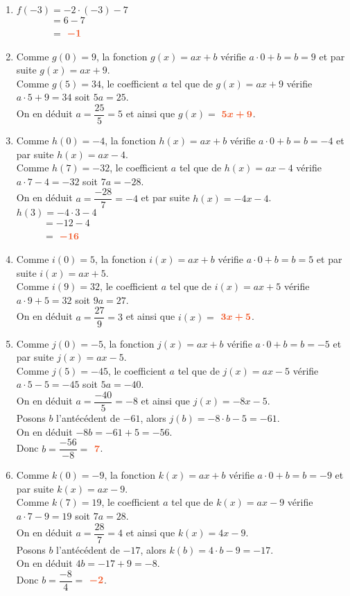 \documentclass[a4paper,12pt]{report}
\begin{document}
\begin{Correction}
\begin{EXO}{}{}

\begin{enumerate}[itemsep=3em]
\item $f(-3)=-2 \cdot (-3)-7$\\$\phantom{f(-3)}=6-7$\\$\phantom{f(-3)}=$ ${\color[HTML]{f15929}\boldsymbol{-1}}$
\item Comme $g(0)=9$, la fonction $g(x)=ax+b$ vérifie $a\cdot 0 + b = b = 9$ et par suite $g(x)=ax+9$.\\Comme $g(5)=34$, le coefficient $a$ tel que de $g(x)=ax+9$ vérifie $a\cdot 5+9 = 34$ soit $5a=25$.\\On en déduit $a=\dfrac{25}{5}=5$ et ainsi que $g(x)=$ ${\color[HTML]{f15929}\boldsymbol{5x+9}}$.
\item Comme $h(0)=-4$, la fonction $h(x)=ax+b$ vérifie $a\cdot 0 + b = b = -4$ et par suite $h(x)=ax-4$.\\Comme $h(7)=-32$, le coefficient $a$ tel que de $h(x)=ax-4$ vérifie $a\cdot 7-4 = -32$ soit $7a=-28$.\\On en déduit $a=\dfrac{-28}{7}=-4$ et par suite $h(x)=-4x-4$.\\$h(3)=-4 \cdot 3-4$\\$\phantom{f(3)}=-12-4$\\$\phantom{f(3)}=$ ${\color[HTML]{f15929}\boldsymbol{-16}}$
\item Comme $i(0)=5$, la fonction $i(x)=ax+b$ vérifie $a\cdot 0 + b = b = 5$ et par suite $i(x)=ax+5$.\\Comme $i(9)=32$, le coefficient $a$ tel que de $i(x)=ax+5$ vérifie $a\cdot 9+5 = 32$ soit $9a=27$.\\On en déduit $a=\dfrac{27}{9}=3$ et ainsi que $i(x)=$ ${\color[HTML]{f15929}\boldsymbol{3x+5}}$.
\item Comme $j(0)=-5$, la fonction $j(x)=ax+b$ vérifie $a\cdot 0 + b = b = -5$ et par suite $j(x)=ax-5$.\\Comme $j(5)=-45$, le coefficient $a$ tel que de $j(x)=ax-5$ vérifie $a\cdot 5-5 = -45$ soit $5a=-40$.\\On en déduit $a=\dfrac{-40}{5}=-8$ et ainsi que $j(x)=-8x-5$.\\Posons $b$ l'antécédent de $-61$, alors $j(b)=-8\cdot b-5=-61$.\\On en déduit $-8b=-61+5=-56$.\\Donc $b=\dfrac{-56}{-8}=$ ${\color[HTML]{f15929}\boldsymbol{7}}$.
\item Comme $k(0)=-9$, la fonction $k(x)=ax+b$ vérifie $a\cdot 0 + b = b = -9$ et par suite $k(x)=ax-9$.\\Comme $k(7)=19$, le coefficient $a$ tel que de $k(x)=ax-9$ vérifie $a\cdot 7-9 = 19$ soit $7a=28$.\\On en déduit $a=\dfrac{28}{7}=4$ et ainsi que $k(x)=4x-9$.\\Posons $b$ l'antécédent de $-17$, alors $k(b)=4\cdot b-9=-17$.\\On en déduit $4b=-17+9=-8$.\\Donc $b=\dfrac{-8}{4}=$ ${\color[HTML]{f15929}\boldsymbol{-2}}$.

\end{enumerate}
\end{EXO}
\end{Correction}
\end{document}
